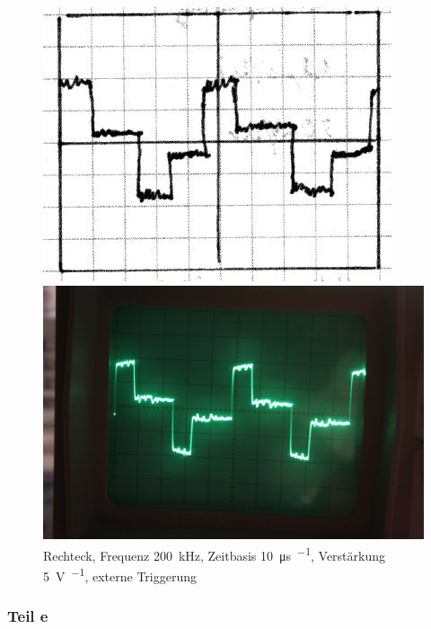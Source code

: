 \begin{figure}[htbp]
	\centering
	\begin{minipage}{.45\linewidth}
	\includegraphics[width=\linewidth]{Skizzen/IMG_0775-1500.jpg}
	\end{minipage}
	\hfill
	\begin{minipage}{.45\linewidth}
	\includegraphics[width=\linewidth]{Fotos/IMG_0775-1500.jpg}
	\end{minipage}
	\caption{%
		Rechteck, Frequenz \SI{200}{\kilo\hertz},
		Zeitbasis \SI{10}{\micro\second\per\division},
		Verstärkung \SI{5}{\volt\per\division},
		externe Triggerung
	}
	\label{fig:0775}
\end{figure}

\subsubsection{Teil e}

